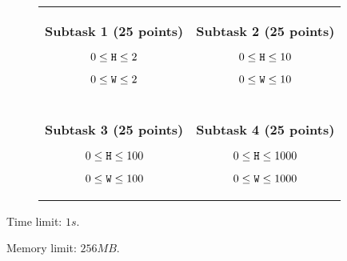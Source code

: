 \documentclass{../../../latex/boi2014}
\newcommand{\param}[1]{{\tt #1}}
\begin{document}
\Subtasks
{}
\begin{figure}[H]
    \centering
    \begin{tabular}{cc}
        \begin{minipage}{0.4\textwidth}    
            \textbf{Subtask 1 (25 points)}
            \begin{description}
                \item $0 \le \param{H} \le 2$
                \item $0 \le \param{W} \le 2$
            \end{description}
        \end{minipage}
            &
        \begin{minipage}{0.4\textwidth}    
            \textbf{Subtask 2 (25 points)}
            \begin{description}
                \item $0 \le \param{H} \le 10$
                \item $0 \le \param{W} \le 10$
            \end{description}
        \end{minipage}
            \\ & \\
        \begin{minipage}{0.4\textwidth}    
            \textbf{Subtask 3 (25 points)}
            \begin{description}
                \item $0 \le \param{H} \le 100$
                \item $0 \le \param{W} \le 100$
            \end{description}
        \end{minipage}
            &
        \begin{minipage}{0.4\textwidth}    
            \textbf{Subtask 4 (25 points)}
            \begin{description}
                \item $0 \le \param{H} \le 1000$
                \item $0 \le \param{W} \le 1000$
            \end{description}
        \end{minipage}
    \end{tabular}
\end{figure}

\Details
{}

Time limit: $1s$.

Memory limit: $256 MB$.

\end{document}
